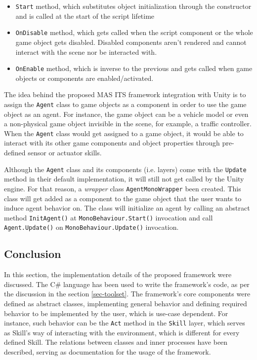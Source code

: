 \documentclass[0main.tex]{subfiles}
\begin{document}
\begin{itemize}
    \item \texttt{Start} method, which substitutes object initialization 
through the constructor and is called at the start of the script lifetime
    \item \texttt{OnDisable} method, which gets called when the script component or the whole game object 
    gets disabled. Disabled components aren't rendered and cannot interact with the scene nor be interacted 
    with. 
    \item \texttt{OnEnable} method, which is inverse to the previous and gets called when game objects 
    or components are enabled/activated.
\end{itemize}

The idea behind the proposed MAS ITS framework integration with Unity is to assign the \texttt{Agent} 
class to game objects as a component in order to use the game object as an agent. For instance, the game object can be 
a vehicle model or even a non-physical game object invisible in the scene, for example, a traffic controller. When 
the \texttt{Agent} class would get assigned to a game object, it would be able to interact with its other game
components and object properties through pre-defined sensor or actuator skills. 

Although the \texttt{Agent} class and its components (i.e. layers) come with the \texttt{Update} method in 
their default implementation, it will still not get called by the Unity engine. For that reason, a \emph{wrapper}
class \texttt{AgentMonoWrapper} been created. This class will get added as a component to the game object that 
the user wants to induce agent behavior on. The class will initialize an agent by calling an abstract method 
\texttt{InitAgent()} at \texttt{MonoBehaviour.Start()} invocation and call \texttt{Agent.Update()} on 
\texttt{MonoBehaviour.Update()} invocation. 

\subsection{Conclusion}

In this section, the implementation details of the proposed framework were discussed. The C\# language has been 
used to write the framework's code, as per the discussion in the section \ref{sec-toolset}. The framework's core 
components were defined as abstract classes, implementing general behavior and defining required behavior to 
be implemented by the user, which is use-case dependent. For instance, such behavior can be the \texttt{Act}
method in the \texttt{Skill} layer, which serves as Skill's way of interacting with the environment, which is 
different for every defined Skill. The relations between classes and inner processes have been described, serving 
as documentation for the usage of the framework. 
\end{document}
